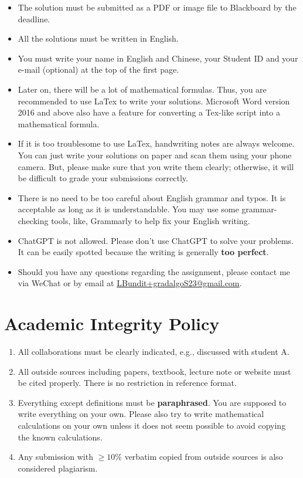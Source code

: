 \begin{itemize}
    
    \item The solution must be submitted as a PDF or image file to Blackboard by the deadline.
    
    \item All the solutions must be written in English.
    
    \item You must write your name in English and Chinese, your Student ID and your e-mail (optional) at the top of the first page. 

    \item Later on, there will be a lot of mathematical formulas. Thus, you are recommended to use LaTex to write your solutions. Microsoft Word version 2016 and above also have a feature for converting a Tex-like script into a mathematical formula. 

    \item If it is too troublesome to use LaTex, handwriting notes are always welcome. You can just write your solutions on paper and scan them using your phone camera. But, please make sure that you write them clearly; otherwise, it will be difficult to grade your submissions correctly. 

    \item  There is no need to be too careful about English grammar and typos. It is acceptable as long as it is understandable. You may use some grammar-checking tools, like, Grammarly to help fix your English writing. 
    
    \item ChatGPT is not allowed. Please don’t use ChatGPT to solve your problems. It can be easily spotted because the writing is generally {\bf too perfect}. 

    \item Should you have any questions regarding the assignment, please contact me via WeChat or by email at \url{LBundit+gradalgoS23@gmail.com}.

\end{itemize}


\section*{Academic Integrity Policy}

\begin{enumerate}
    \item All collaborations must be clearly indicated, e.g., discussed with student A. 
    \item All outside sources including papers, textbook, lecture note or website must be cited properly. There is no restriction in reference format. 
    \item Everything except definitions must be {\bf paraphrased}. You are supposed to write everything on your own. Please also try to write mathematical calculations on your own unless it does not seem possible to avoid copying the known calculations.
    \item Any submission with {\bf $\ge 10\%$} verbatim copied from outside sources is also considered plagiarism.
\end{enumerate}


